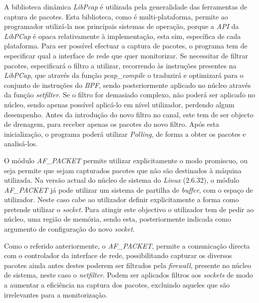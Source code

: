 A biblioteca dinâmica \textit{LibPcap} é utilizada pela generalidade das ferramentas de captura de pacotes.
Esta biblioteca, como é multi-plataforma, permite ao programador utilizá-la nos principais sistemas de operação, porque a \textit{API} da \textit{LibPCap} é opaca relativamente à implementação, esta sim, específica de cada plataforma.
Para ser possível efectuar a captura de pacotes, o programa tem de especificar qual a interface de rede que quer monitorizar.
Se necessitar de filtrar pacotes, especificará o filtro a utilizar, recorrendo às instruções presentes na \textit{LibPCap}, que através da função  \textit{pcap\_compile} o traduzirá e optimizará para o conjunto de instruções do \textit{BPF}, sendo posteriormente aplicado no núcleo através da função \textit{setfilter}.
Se o filtro for demasiado complexo, não poderá ser aplicado no núcleo, sendo apenas possível aplicá-lo em nível utilizador, perdendo algum desempenho.
Antes da introdução do novo filtro no canal, este tem de ser objecto de drenagem, para receber apenas os pacotes do novo filtro.
Após esta inicialização, o programa poderá utilizar \textit{Polling}, de forma a obter os pacotes e analisá-los.


O módulo \textit{AF\_PACKET} permite utilizar explicitamente o modo promiscuo, ou seja permite que sejam capturados pacotes que não são destinados à máquina utilizada.
Na versão actual do núcleo de sistema do \textit{Linux} (2.6.32), o módulo \textit{AF\_PACKET} já pode utilizar um sistema de partilha de \textit{buffer}, com o espaço de utilizador.
Neste caso cabe ao utilizador definir explicitamente a forma como pretende utilizar o \textit{socket}. 
Para atingir este objectivo o utilizador tem de pedir ao núcleo, uma região de memória, sendo esta, posteriormente indicada como argumento de configuração do novo \textit{socket}.

Como o referido anteriormente, o \textit{AF\_PACKET}, permite a comunicação directa com o controlador da interface de rede, possibilitando capturar os diversos pacotes ainda antes destes poderem ser filtrados pela \textit{firewall}, presente no núcleo de sistema, neste caso o \textit{netfilter}.
Podem ser aplicados filtros aos \textit{sockets} de modo a aumentar a eficiência na captura dos pacotes, excluindo aqueles que são irrelevantes para a monitorização.


